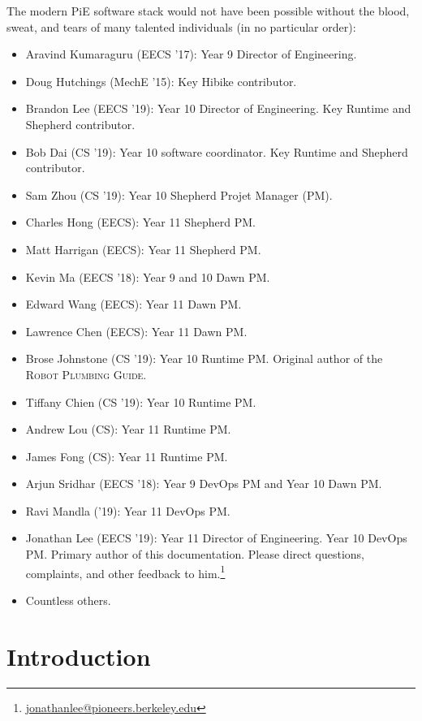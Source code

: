 \documentclass[12pt]{book}
\begin{document}
  The modern PiE software stack would not have been possible without the blood, sweat, and tears of many talented individuals (in no particular order):
  \begin{itemize}
    \item
      Aravind Kumaraguru (EECS '17): Year 9 Director of Engineering.
    \item
      Doug Hutchings (MechE '15): Key Hibike contributor.
    \item
      Brandon Lee (EECS '19): Year 10 Director of Engineering. Key Runtime and Shepherd contributor.
    \item
      Bob Dai (CS '19): Year 10 software coordinator. Key Runtime and Shepherd contributor.
    \item
      Sam Zhou (CS '19): Year 10 Shepherd Projet Manager (PM).
    \item
      Charles Hong (EECS): Year 11 Shepherd PM.
    \item
      Matt Harrigan (EECS): Year 11 Shepherd PM.
    \item
      Kevin Ma (EECS '18): Year 9 and 10 Dawn PM.
    \item
      Edward Wang (EECS): Year 11 Dawn PM.
    \item
      Lawrence Chen (EECS): Year 11 Dawn PM.
    \item
      Brose Johnstone (CS '19): Year 10 Runtime PM.
      Original author of the \textsc{Robot Plumbing Guide}.
    \item
      Tiffany Chien (CS '19): Year 10 Runtime PM.
    \item
      Andrew Lou (CS): Year 11 Runtime PM.
    \item
      James Fong (CS): Year 11 Runtime PM.
    \item
      Arjun Sridhar (EECS '18): Year 9 DevOps PM and Year 10 Dawn PM.
    \item
      Ravi Mandla ('19): Year 11 DevOps PM.
    \item
      Jonathan Lee (EECS '19): Year 11 Director of Engineering.
      Year 10 DevOps PM.
      Primary author of this documentation.
      Please direct questions, complaints, and other feedback to him.\footnote{\url{jonathanlee@pioneers.berkeley.edu}}
    \item
      Countless others.
  \end{itemize}

  \mainmatter

  \chapter{Introduction}
\end{document}
